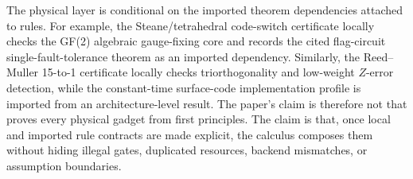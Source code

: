 The physical layer is conditional on the imported theorem dependencies attached to \Certified{} rules.
For example, the Steane/tetrahedral code-switch certificate locally checks the GF(2) algebraic gauge-fixing core and records the cited flag-circuit single-fault-tolerance theorem as an imported dependency.
Similarly, the Reed--Muller 15-to-1 certificate locally checks triorthogonality and low-weight $Z$-error detection, while the constant-time surface-code implementation profile is imported from an architecture-level result.
The paper's claim is therefore not that \system proves every physical gadget from first principles.
The claim is that, once local and imported rule contracts are made explicit, the calculus composes them without hiding illegal gates, duplicated resources, backend mismatches, or assumption boundaries.
